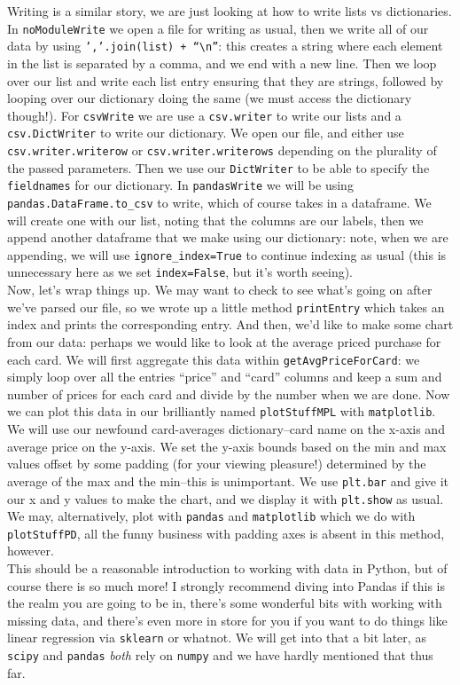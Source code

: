 \documentclass[12pt]{article}
\begin{document}
Writing is a similar story, we are just looking at how to write lists vs dictionaries. In \texttt{noModuleWrite} we open a file for writing as usual, then we write all of our data by using \texttt{','.join(list) + ``\textbackslash n''}: this creates a string where each element in the list is separated by a comma, and we end with a new line. Then we loop over our list and write each list entry ensuring that they are strings, followed by looping over our dictionary doing the same (we must access the dictionary though!). For \texttt{csvWrite} we are use a \texttt{csv.writer} to write our lists and a \texttt{csv.DictWriter} to write our dictionary. We open our file, and either use \texttt{csv.writer.writerow} or \texttt{csv.writer.writerows} depending on the plurality of the passed parameters. Then we use our \texttt{DictWriter} to be able to specify the \texttt{fieldnames} for our dictionary. In \texttt{pandasWrite} we will be using \texttt{pandas.DataFrame.to\_csv} to write, which of course takes in a dataframe. We will create one with our list, noting that the columns are our labels, then we append another dataframe that we make using our dictionary: note, when we are appending, we will use \texttt{ignore\_index=True} to continue indexing as usual (this is unnecessary here as we set \texttt{index=False}, but it's worth seeing).\\
Now, let's wrap things up. We may want to check to see what's going on after we've parsed our file, so we wrote up a little method \texttt{printEntry} which takes an index and prints the corresponding entry. And then, we'd like to make some chart from our data: perhaps we would like to look at the average priced purchase for each card. We will first aggregate this data within \texttt{getAvgPriceForCard}: we simply loop over all the entries ``price'' and ``card'' columns and keep a sum and number of prices for each card and divide by the number when we are done. Now we can plot this data in our brilliantly named \texttt{plotStuffMPL} with \texttt{matplotlib}. We will use our newfound card-averages dictionary--card name on the x-axis and average price on the y-axis. We set the y-axis bounds based on the min and max values offset by some padding (for your viewing pleasure!) determined by the average of the max and the min--this is unimportant. We use \texttt{plt.bar} and give it our x and y values to make the chart, and we display it with \texttt{plt.show} as usual. We may, alternatively, plot with \texttt{pandas} and \texttt{matplotlib} which we do with \texttt{plotStuffPD}, all the funny business with padding axes is absent in this method, however.\\
This should be a reasonable introduction to working with data in Python, but of course there is so much more! I strongly recommend diving into Pandas if this is the realm you are going to be in, there's some wonderful bits with working with missing data, and there's even more in store for you if you want to do things like linear regression via \texttt{sklearn} or whatnot. We will get into that a bit later, as \texttt{scipy} and \texttt{pandas} \textit{both} rely on \texttt{numpy} and we have hardly mentioned that thus far.\\
\end{document}
